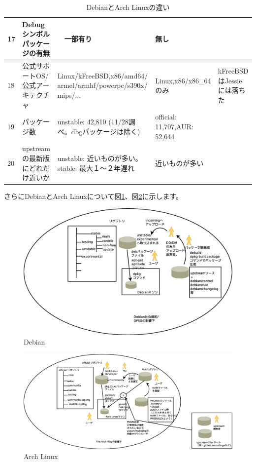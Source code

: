 \documentclass[mingoth,a4paper]{jsarticle}
\begin{document}
\begin{table}[ht]
\begin{center}
\begin{tabular}{|l|p{3cm}|p{4cm}|p{4cm}|p{3cm}|}
17 & Debugシンボルパッケージの有無 &　一部有り & 無し & \\ \hline
18 & 公式サポートOS/公式アーキテクチャ & Linux/kFreeBSD,x86/amd64/ armel/armhf/powerpc/s390x/ mips/... & Linux,x86/x86\_64のみ & kFreeBSDはJessieには落ちた\\ \hline
19 & パッケージ数 & unstable: 42,810 (11/28調べ。dbgパッケージは除く) & official: 11,707,AUR: 52,644 & \\ \hline
20 & upstreamの最新版にどれだけ近いか & unstable: 近いものが多い。stable: 最大１〜２年遅れ & 近いものが多い & \\ \hline
\end{tabular}
\end{center}
\caption{DebianとArch Linuxの違い}
\label{tab:diff-debian-arch}
\end{table}

 さらにDebianとArch Linuxについて図\ref{fig:debian-schema}、図\ref{fig:arch-linux-schema}に示します。

\begin{figure}[H]
\begin{center}
 \includegraphics[width=0.8\hsize]{image201411/debian-schema.eps}
 \caption{Debian}\label{fig:debian-schema}
\end{center}
\end{figure}

\begin{figure}[H]
\begin{center}
 \includegraphics[width=0.8\hsize]{image201411/arch-schema.eps}
 \caption{Arch Linux}\label{fig:arch-linux-schema}
\end{center}
\end{figure}
\end{document}
